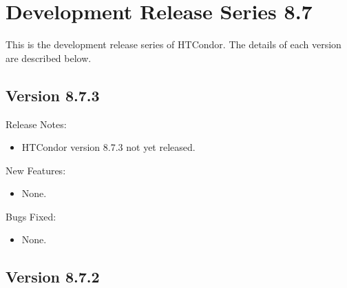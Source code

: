 
\section{\label{sec:History-8-5}Development Release Series 8.7}

This is the development release series of HTCondor.
The details of each version are described below.

\subsection*{\label{sec:New-8-7-3}Version 8.7.3}

\noindent Release Notes:

\begin{itemize}

\item HTCondor version 8.7.3 not yet released.

\end{itemize}


\noindent New Features:

\begin{itemize}

\item None.

\end{itemize}

\noindent Bugs Fixed:

\begin{itemize}

\item None.

\end{itemize}

\subsection*{\label{sec:New-8-7-2}Version 8.7.2}

